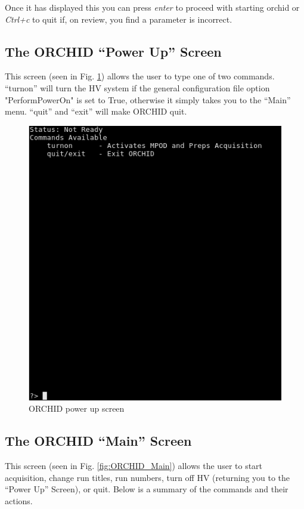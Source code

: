 \documentclass[onecolumn, 10pt, letterpaper, twoside]{article}
\begin{document}
Once it has displayed this you can press \emph{enter} to proceed with starting orchid or \emph{Ctrl+c} to quit if, on review, you find a parameter is incorrect.
\clearpage{}
\subsection{The ORCHID ``Power Up'' Screen}
This screen (seen in Fig. \ref{fig:ORCHID_Powerup}) allows the user to type one of two commands. ``turnon'' will turn the HV system if the general configuration file option "PerformPowerOn" is set to True, otherwise it simply takes you to the ``Main'' menu. ``quit'' and ``exit'' will make ORCHID quit.
\begin{figure}[h!]
\begin{center}
\includegraphics[width=\textwidth]{./img/Powerup_Menu.png}
\caption{ORCHID power up screen}
\label{fig:ORCHID_Powerup}
\end{center}
\end{figure}

\subsection{The ORCHID ``Main'' Screen}
This screen (seen in Fig. \ref{fig:ORCHID_Main}) allows the user to start acquisition, change run titles, run numbers, turn off HV (returning you to the ``Power Up'' Screen), or quit. Below is a summary of the commands and their actions.
\end{document}
